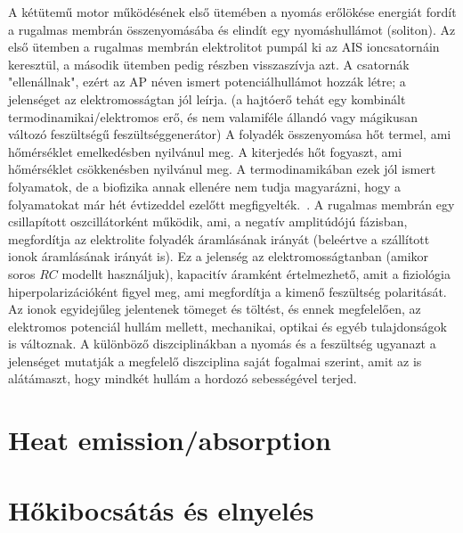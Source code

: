 \else
A kétütemű motor működésének első ütemében a nyomás erőlökése
energiát fordít a  rugalmas membrán összenyomásába és elindít 
egy nyomáshullámot (soliton).
Az első ütemben a rugalmas membrán elektrolitot pumpál ki
az \gls{AIS} ioncsatornáin keresztül, a második ütemben pedig részben visszaszívja azt. A csatornák "ellenállnak",
ezért az \gls{AP} néven ismert potenciálhullámot hozzák létre;
a jelenséget az elektromosságtan jól leírja. 
(a hajtóerő tehát egy kombinált termodinamikai/elektromos erő,
és nem valamiféle állandó vagy mágikusan változó  feszültségű
feszültséggenerátor)
A folyadék összenyomása hőt termel, ami hőmérséklet emelkedésben 
nyilvánul meg.
A kiterjedés hőt fogyaszt, ami hőmérséklet csökkenésben nyilvánul meg.
A termodinamikában ezek jól ismert folyamatok, 
de a biofizika annak ellenére nem tudja magyarázni, hogy a folyamatokat
már hét évtizeddel ezelőtt megfigyelték.~\cite{HeatProductionNeuron:1958}.
A rugalmas membrán egy csillapított oszcillátorként működik,
ami, a negatív amplitúdójú fázisban, megfordítja az elektrolite folyadék
áramlásának irányát (beleértve a szállított ionok áramlásának irányát is).
Ez a jelenség az elektromosságtanban (amikor soros  $RC$  modellt használjuk), kapacitív áramként értelmezhető, amit a fiziológia 
hiperpolarizációként figyel meg, ami megfordítja a kimenő feszültség polaritását.
Az ionok egyidejűleg jelentenek tömeget és töltést,
és ennek megfelelően, az elektromos potenciál hullám mellett,
mechanikai, optikai és egyéb tulajdonságok is változnak. 
A különböző diszciplinákban a nyomás és a feszültség 
ugyanazt a jelenséget mutatják a megfelelő diszciplina saját
fogalmai szerint, amit az is alátámaszt, hogy mindkét hullám a hordozó sebességével terjed.

\fi

\ifx\magyar\undefined
\section{Heat emission/absorption\label{sec:HeatAbsorption}}
\else
\section{Hőkibocsátás és elnyelés\label{sec:HeatAbsorption}}
\fi

